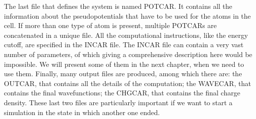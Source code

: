 The last file that defines the system is named POTCAR. It contains all the information about the pseudopotentials that have to be used for the atoms in the cell. If more than one type of atom is present, multiple POTCARs are concatenated in a unique file. All the computational instructions, like the energy cutoff, are specified in the INCAR file. The INCAR file can contain a very vast number of parameters, of which giving a comprehensive description here would be impossible. We will  present some of them in the next chapter, when we need to use them. Finally, many output files are produced, among which there are: the OUTCAR, that contains all the details of the computation; the WAVECAR, that contains the final wavefunctions; the CHGCAR, that contains the final charge density. These last two files are particularly important if we want to start a simulation in the state in which another one ended.